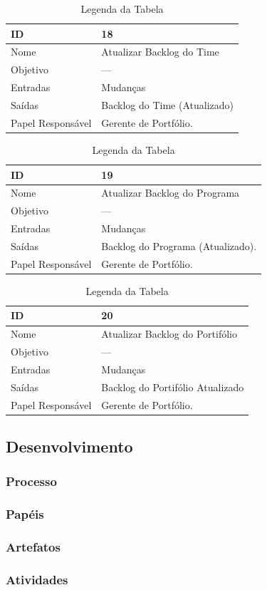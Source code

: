\begin{table}[H]
  \centering
    \begin{tabular}{| m{5em} | m{10cm} |}
      \hline
      ID       & 18   \\ \hline
      Nome     & Atualizar Backlog do Time  \\ \hline
      Objetivo & ---  \\ \hline
      Entradas & Mudanças \\ \hline
      Saídas   & Backlog do Time (Atualizado) \\ \hline
      Papel Responsável   & Gerente de Portfólio. \\ \hline
    \end{tabular}
    \caption{Legenda da Tabela}
    \label{tabela:atividade18}
\end{table}

\begin{table}[H]
  \centering
    \begin{tabular}{| m{5em} | m{10cm} |}
      \hline
      ID       & 19   \\ \hline
      Nome     & Atualizar Backlog do Programa  \\ \hline
      Objetivo & ---  \\ \hline
      Entradas & Mudanças\\ \hline
      Saídas   & Backlog do Programa (Atualizado). \\ \hline
      Papel Responsável   & Gerente de Portfólio. \\ \hline
    \end{tabular}
    \caption{Legenda da Tabela}
    \label{tabela:atividade19}
\end{table}

\begin{table}[H]
  \centering
    \begin{tabular}{| m{5em} | m{10cm} |}
      \hline
      ID       & 20   \\ \hline
      Nome     & Atualizar Backlog do Portifólio  \\ \hline
      Objetivo & ---  \\ \hline
      Entradas & Mudanças \\ \hline
      Saídas   & Backlog do Portifólio Atualizado \\ \hline
      Papel Responsável   & Gerente de Portfólio. \\ \hline
    \end{tabular}
    \caption{Legenda da Tabela}
    \label{tabela:atividade20}
\end{table}

\subsection{Desenvolvimento}
\subsubsection{Processo}
\subsubsection{Papéis}
\subsubsection{Artefatos}
\subsubsection{Atividades}
